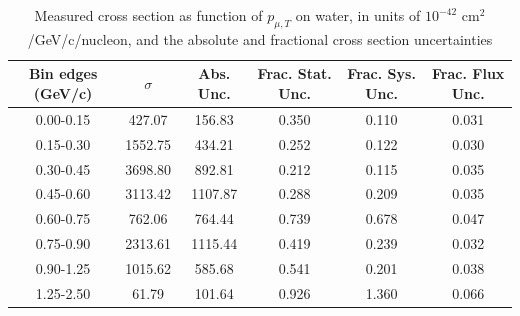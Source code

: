 \documentclass[../main.tex]{subfiles}
\begin{document}
\begin{table}
  \centering
  \renewcommand{\arraystretch}{1.15}
  \caption{Systematic covariance matrix of measured cross section in $p_{\mu,||}$ on water, in units of $10^{-84}$ $(\text{cm}^2$/GeV/c/nucleon$)^2$}
  \label{tbl:sysnucleonnuc10muon_pzc}
\end{table}
\pagebreak
\begin{turnpage}
\end{turnpage}
\begin{table}
  \centering
  \renewcommand{\arraystretch}{1.15}
  \caption{Measured cross section as function of $p_{\mu,T}$ on water, in units of $10^{-42}$ $\text{cm}^2$/GeV/c/nucleon, and the absolute and fractional cross section uncertainties}
    \begin{tabular}{c||c|c||c|c|c}
      Bin edges (GeV/c) &  $\sigma$  &  Abs. Unc.  &  Frac. Stat. Unc.  &  Frac. Sys. Unc.  &  Frac. Flux Unc. \\
      \hline
      \hline
      0.00-0.15 & 427.07 & 156.83 & 0.350 & 0.110 & 0.031\\
      0.15-0.30 & 1552.75 & 434.21 & 0.252 & 0.122 & 0.030\\
      0.30-0.45 & 3698.80 & 892.81 & 0.212 & 0.115 & 0.035\\
      0.45-0.60 & 3113.42 & 1107.87 & 0.288 & 0.209 & 0.035\\
      0.60-0.75 & 762.06 & 764.44 & 0.739 & 0.678 & 0.047\\
      0.75-0.90 & 2313.61 & 1115.44 & 0.419 & 0.239 & 0.032\\
      0.90-1.25 & 1015.62 & 585.68 & 0.541 & 0.201 & 0.038\\
      1.25-2.50 & 61.79 & 101.64 & 0.926 & 1.360 & 0.066
    \end{tabular}
  \label{tbl:datanucleonnuc10muon_pta}
\end{table}
\end{document}
